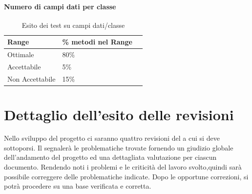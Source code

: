\documentclass[12pt,a4paper]{article}
\begin{document}
\paragraph{Numero di campi dati per classe}
\begin{table}[H]
	\begin{center}
		\begin{tabular}{p{} p{} p{}}
			\toprule
			\textbf{Range}   & \textbf{\% metodi nel Range}	 \\ \midrule
			\midrule
			Ottimale & 80\% \\ \midrule
			Accettabile & 5\%  \\ \midrule
			Non Accettabile  & 15\%  \\ \midrule
			\bottomrule
		\end{tabular}
	\end{center}
	\caption{Esito dei test su campi dati/classe}
\end{table}


\section{Dettaglio dell'esito delle revisioni}
Nello sviluppo del progetto ci saranno quattro revisioni del  a cui si deve sottoporsi. Il  segnalerà le problematiche trovate fornendo un giudizio globale dell'andamento del progetto ed una dettagliata valutazione per ciascun documento. Rendendo noti i problemi e le criticità del lavoro svolto,quindi sarà possibile correggere delle problematiche indicate. Dopo le opportune correzioni, si potrà procedere su una base verificata e corretta.
\end{document}
